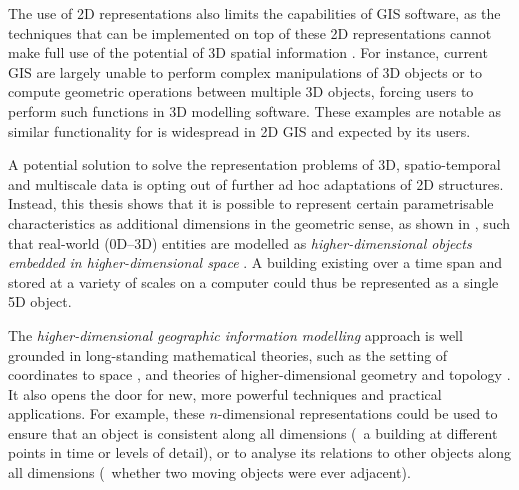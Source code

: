 
The use of 2D representations also limits the capabilities of GIS software, as the techniques that can be implemented on top of these 2D representations cannot make full use of the potential of 3D spatial information \citep[Ch.~3]{Zlatanova00}.
For instance, current GIS are largely unable to perform complex manipulations of 3D objects or to compute geometric operations between multiple 3D objects, forcing users to perform such functions in 3D modelling software.
These examples are notable as similar functionality for is widespread in 2D GIS and expected by its users.


A potential solution to solve the representation problems of 3D, spatio-temporal and multiscale data is opting out of further ad hoc adaptations of 2D structures.
Instead, this thesis shows that it is possible to represent certain parametrisable characteristics as additional dimensions in the geometric sense, as shown in , such that real-world (0D--3D) entities are modelled as \emph{higher-dimensional objects embedded in higher-dimensional space} \citep{vanOosterom10}.
A building existing over a time span and stored at a variety of scales on a computer could thus be represented as a single 5D object.


The \emph{higher-dimensional geographic information modelling} approach is well grounded in long-standing mathematical theories, such as the setting of coordinates to space \citep{Descartes37}, and theories of higher-dimensional geometry \citep{Riemann68} and topology \citep{Poincare95}.
It also opens the door for new, more powerful techniques and practical applications.
For example, these $n$-dimensional representations could be used to ensure that an object is consistent along all dimensions (\eg\ a building at different points in time or levels of detail), or to analyse its relations to other objects along all dimensions (\eg\ whether two moving objects were ever adjacent).

